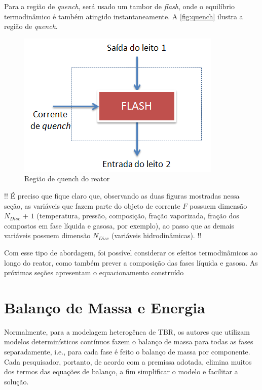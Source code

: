 
Para a região de \emph{quench}, será usado um tambor de \emph{flash}, onde o
equilíbrio termodinâmico é também atingido instantaneamente. A
\autoref{fig:quench} ilustra a região de \emph{quench}.

 \begin{figure}[htb]
 \centering \includegraphics[scale=0.75]{images/Chap3/quench.png}
 \caption{Região de quench do reator}
 \label{fig:quench}
 \end{figure}

!! É preciso que fique claro que, observando as duas figuras mostradas nessa
seção, as variáveis que fazem parte do objeto de corrente $F$ possuem dimensão
$N_{Disc}$ + $1$ (temperatura, pressão, composição, fração vaporizada, fração
dos compostos em fase líquida e gasosa, por exemplo), ao passo que as demais
variáveis possuem dimensão $N_{Disc}$ (variáveis hidrodinâmicas). !!

Com esse tipo de abordagem, foi possível considerar os efeitos termodinâmicos
ao longo do reator, como também prever a composição das fases líquida e
gasosa. As próximas seções apresentam o equacionamento construído

\section{Balanço de Massa e Energia} \label{sec:balancomassaenergia}

Normalmente, para a modelagem heterogênea de TBR, os autores que
utilizam modelos determinísticos contínuos fazem o balanço de massa para todas as
fases separadamente, i.e., para cada fase é feito o balanço de massa por
componente. %
Cada pesquisador, portanto, de acordo com a premissa adotada, elimina muitos dos
termos das equações de balanço, a fim simplificar o modelo e facilitar a
solução. 


